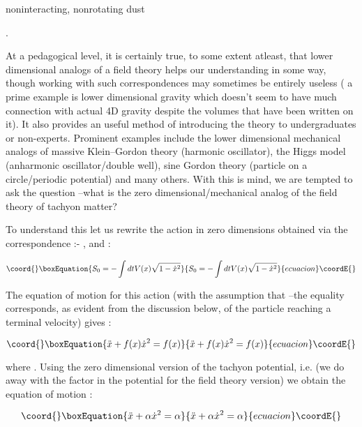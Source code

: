 \documentclass[a4paper,prd,aps,twocolumn]{revtex4}
\begin{document}
noninteracting, nonrotating dust {\cite{sen1}.

At a pedagogical level, it is certainly true, to some extent atleast,
that lower dimensional analogs
of a field theory helps our understanding in some way, though
working with such correspondences may sometimes be entirely useless
( a prime example is lower dimensional gravity which doesn't seem
to have much connection with actual 4D gravity despite the volumes that
have been written on it). 
It also provides an useful method of
introducing the theory to undergraduates or non-experts. Prominent
examples include the lower dimensional mechanical 
analogs of massive Klein--Gordon theory
(harmonic oscillator), the Higgs model (anharmonic oscillator/double well),
sine Gordon theory (particle on a circle/periodic potential) and many
others. With this is mind, we are tempted to ask the question --what
is the zero dimensional/mechanical 
analog of the field theory of tachyon matter?

To understand this let us rewrite the action in zero dimensions obtained 
via the correspondence :-  \coordHE{}, \coordHE{} and 
\coordHE{} :

\begin{equation}\coord{}\boxEquation{
S_0 = -\int dt V(x) \sqrt{1-{\dot x}^2}
}{
S_0 = -\int dt V(x) \sqrt{1-{\dot x}^2}
}{ecuacion}\coordE{}\end{equation}

The equation of motion for this action (with the assumption that \coordHE{}--the equality corresponds, as evident from the discussion below, of
the particle reaching a terminal velocity) gives :

\begin{equation}\coord{}\boxEquation{
\ddot x + f(x){\dot x}^2 = f(x)
}{
\ddot x + f(x){\dot x}^2 = f(x)
}{ecuacion}\coordE{}\end{equation}

where \coordHE{}.
Using the zero dimensional version of the tachyon potential, i.e. 
\coordHE{} (we do away with the \coordHE{} factor in
the potential for the field theory version)
we obtain the equation of motion :

\begin{equation}\coord{}\boxEquation{
\ddot x +\alpha {\dot x}^2 = \alpha
}{
\ddot x +\alpha {\dot x}^2 = \alpha
}{ecuacion}\coordE{}\end{equation}

}
\end{document}
